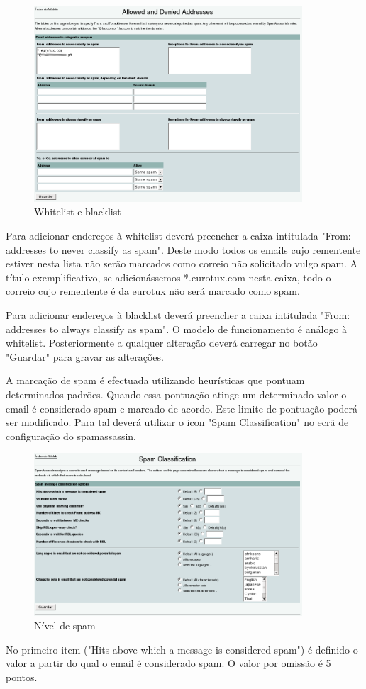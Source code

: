 \begin{figure}[H]
    \begin{center}
        \includegraphics[width=10cm]{include/img/spam2}
    \end{center}
    \caption{Whitelist e blacklist}
    \label{fig:SPAM2}
\end{figure}

Para adicionar endereços à whitelist deverá preencher a caixa intitulada "From: addresses to never classify as spam". Deste modo todos os emails cujo rementente estiver nesta lista não serão marcados como correio não solicitado vulgo spam. A título exemplificativo, se adicionássemos *.eurotux.com nesta caixa, todo o correio cujo rementente é da eurotux não será marcado como spam.

Para adicionar endereços à blacklist deverá preencher a caixa intitulada "From: addresses to always classify as spam". O modelo de funcionamento é análogo à whitelist.
Posteriormente a qualquer alteração deverá carregar no botão "Guardar" para gravar as alterações.

A marcação de spam é efectuada utilizando heurísticas que pontuam determinados padrões. Quando essa pontuação atinge um determinado valor o email é considerado spam e marcado de acordo. Este limite de pontuação poderá ser modificado. Para tal deverá utilizar o icon "Spam Classification" no ecrã de configuração do spamassassin.

\begin{figure}[H]
    \begin{center}
        \includegraphics[width=10cm]{include/img/spam3}
    \end{center}
    \caption{Nível de spam}
    \label{fig:SPAM3}
\end{figure}

No primeiro item ("Hits above which a message is considered spam") é definido o valor a partir do qual o email é considerado spam. O valor por omissão é 5 pontos.
